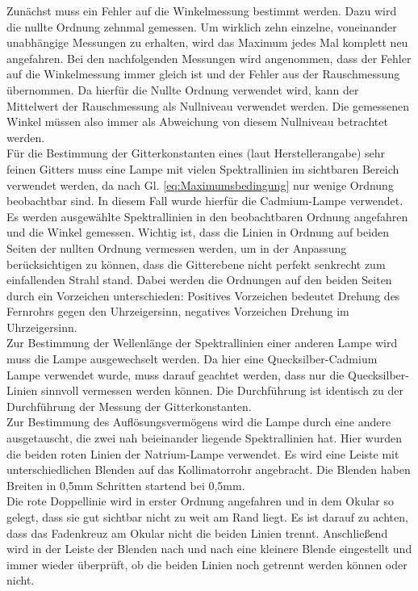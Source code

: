 \documentclass[12pt,a4paper]{article}
\begin{document}
Zunächst muss ein Fehler auf die Winkelmessung bestimmt werden. Dazu wird die nullte Ordnung zehnmal gemessen. Um wirklich zehn einzelne, voneinander unabhängige Messungen zu erhalten, wird das Maximum jedes Mal komplett neu angefahren. Bei den nachfolgenden Messungen wird angenommen, dass der Fehler auf die Winkelmessung immer gleich ist und der Fehler aus der Rauschmessung übernommen. Da hierfür die Nullte Ordnung verwendet wird, kann der Mittelwert der Rauschmessung als Nullniveau verwendet werden. Die gemessenen Winkel müssen also immer als Abweichung von diesem Nullniveau betrachtet werden.\\
Für die Bestimmung der Gitterkonstanten eines (laut Herstellerangabe) sehr feinen Gitters muss eine Lampe mit vielen Spektrallinien im sichtbaren Bereich verwendet werden, da nach Gl. \ref{eq:Maximumsbedingung} nur wenige Ordnung beobachtbar sind. In diesem Fall wurde hierfür die Cadmium-Lampe verwendet. Es werden ausgewählte Spektrallinien in den beobachtbaren Ordnung angefahren und die Winkel gemessen. Wichtig ist, dass die Linien in Ordnung auf beiden Seiten der nullten Ordnung vermessen werden, um in der Anpassung berücksichtigen zu können, dass die Gitterebene nicht perfekt senkrecht zum einfallenden Strahl stand. Dabei werden die Ordnungen auf den beiden Seiten durch ein Vorzeichen unterschieden: Positives Vorzeichen bedeutet Drehung des Fernrohrs gegen den Uhrzeigersinn, negatives Vorzeichen Drehung im Uhrzeigersinn.\\
Zur Bestimmung der Wellenlänge der Spektrallinien einer anderen Lampe wird muss die Lampe ausgewechselt werden. Da hier eine Quecksilber-Cadmium Lampe verwendet wurde, muss darauf geachtet werden, dass nur die Quecksilber-Linien sinnvoll vermessen werden können. Die Durchführung ist identisch zu der Durchführung der Messung der Gitterkonstanten.\\
Zur Bestimmung des Auflösungsvermögens wird die Lampe durch eine andere ausgetauscht, die zwei nah beieinander liegende Spektrallinien hat. Hier wurden die beiden roten Linien der Natrium-Lampe verwendet. Es wird eine Leiste mit unterschiedlichen Blenden auf das Kollimatorrohr angebracht. Die Blenden haben Breiten in 0,5mm Schritten startend bei 0,5mm.\\
Die rote Doppellinie wird in erster Ordnung angefahren und in dem Okular so gelegt, dass sie gut sichtbar nicht zu weit am Rand liegt. Es ist darauf zu achten, dass das Fadenkreuz am Okular nicht die beiden Linien trennt. Anschließend wird in der Leiste der Blenden nach und nach eine kleinere Blende eingestellt und immer wieder überprüft, ob die beiden Linien noch getrennt werden können oder nicht.
\end{document}
